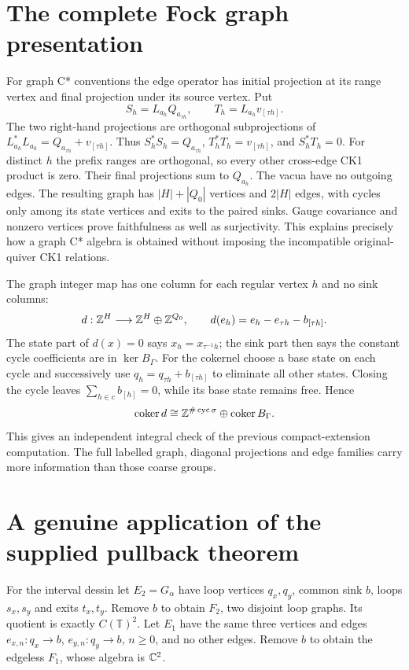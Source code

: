 \section{The complete Fock graph presentation}
For graph C* conventions the edge operator has initial projection at its range vertex and final projection under its source vertex. Put
\[
 S_h=L_{a_h}Q_{a_{\tau h}},\qquad T_h=L_{a_h}v_{[\tau h]}.
\]
The two right-hand projections are orthogonal subprojections of $L_{a_h}^*L_{a_h}=Q_{a_{\tau h}}+v_{[\tau h]}$. Thus $S_h^*S_h=Q_{a_{\tau h}}$, $T_h^*T_h=v_{[\tau h]}$, and $S_h^*T_h=0$. For distinct $h$ the prefix ranges are orthogonal, so every other cross-edge CK1 product is zero. Their final projections sum to $Q_{a_h}$. The vacua have no outgoing edges. The resulting graph has $|H|+|Q_0|$ vertices and $2|H|$ edges, with cycles only among its state vertices and exits to the paired sinks. Gauge covariance and nonzero vertices prove faithfulness as well as surjectivity. This explains precisely how a graph C* algebra is obtained without imposing the incompatible original-quiver CK1 relations.

The graph integer map has one column for each regular vertex $h$ and no sink columns:
\[
 d:\mathbb Z^H\longrightarrow\mathbb Z^H\oplus\mathbb Z^{Q_0},\qquad
 d(e_h)=e_h-e_{\tau h}-b_{[\tau h]}.
\]
The state part of $d(x)=0$ says $x_h=x_{\tau^{-1}h}$; the sink part then says the constant cycle coefficients are in $\ker B_\Gamma$. For the cokernel choose a base state on each cycle and successively use $q_h=q_{\tau h}+b_{[\tau h]}$ to eliminate all other states. Closing the cycle leaves $\sum_{h\in c}b_{[h]}=0$, while its base state remains free. Hence
\[
 \operatorname{coker}d\cong\mathbb Z^{\#\operatorname{cyc}\sigma}\oplus\operatorname{coker}B_\Gamma.
\]
This gives an independent integral check of the previous compact-extension computation. The full labelled graph, diagonal projections and edge families carry more information than those coarse groups.

\section{A genuine application of the supplied pullback theorem}
For the interval dessin let $E_2=G_\alpha$ have loop vertices $q_x,q_y$, common sink $b$, loops $s_x,s_y$ and exits $t_x,t_y$. Remove $b$ to obtain $F_2$, two disjoint loop graphs. Its quotient is exactly $C(\mathbb T)^2$. Let $E_1$ have the same three vertices and edges $e_{x,n}:q_x\to b$, $e_{y,n}:q_y\to b$, $n\ge0$, and no other edges. Remove $b$ to obtain the edgeless $F_1$, whose algebra is $\mathbb C^2$.

